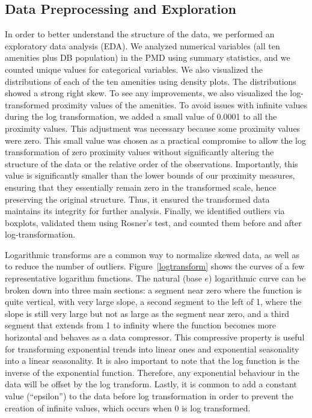 \documentclass[11pt, a4paper]{article}
\begin{document}
\subsection{Data Preprocessing and Exploration}


In order to better understand the structure of the data, we performed an exploratory data analysis (EDA). We analyzed numerical variables (all ten amenities plus DB population) in the PMD using summary statistics, and we counted unique values for categorical variables. We also visualized the distributions of each of the ten amenities using density plots. The distributions showed a strong right skew. To see any improvements, we also visualized the log-transformed proximity values of the amenities. To avoid issues with infinite values during the log transformation, we added a small value of 0.0001 to all the proximity values. This adjustment was necessary because some proximity values were zero. This small value was chosen as a practical compromise to allow the log transformation of zero proximity values without significantly altering the structure of the data or the relative order of the observations. Importantly, this value is significantly smaller than the lower bounds of our proximity measures, ensuring that they essentially remain zero in the transformed scale, hence preserving the original structure. Thus, it ensured the transformed data maintains its integrity for further analysis.  Finally, we identified outliers via boxplots, validated them using Rosner’s test, and counted them before and after log-transformation.
\par
Logarithmic transforms are a common way to normalize skewed data, as well as to reduce the number of outliers. Figure~\ref{logtransform} shows the curves of a few representative logarithm functions. The natural (base $e$) logarithmic curve can be broken down into three main sections: a segment near zero where the function is quite vertical, with very large slope, a second segment to the left of 1, where the slope is still very large but not as large as the segment near zero, and a third segment that extends from 1 to infinity where the function becomes more horizontal and behaves as a data compressor. This compressive property is useful for transforming exponential trends into linear ones and exponential seasonality into a linear seasonality. It is also important to note that the log function is the inverse of the exponential function. Therefore, any exponential behaviour in the data will be offset by the log transform. Lastly, it is common to add a constant value (``epsilon'') to the data before log transformation in order to prevent the creation of infinite values, which occurs when 0 is log transformed.
\end{document}
